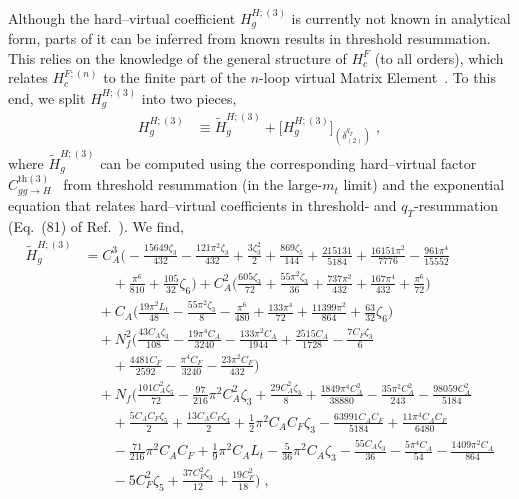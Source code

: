\documentclass[12pt]{article}
\DeclareRobustCommand{\nn}{\nonumber}
\DeclareRobustCommand{\qt}{\ensuremath{q_T}\xspace}
\begin{document}
Although the hard--virtual coefficient $H^{H;(3)}_{g}$ is currently not known in analytical form, parts of it can be inferred from known results in threshold resummation.
This relies on the knowledge of the general structure of $H^{F}_{c}$ (to all orders), which relates $H^{F;(n)}_{c}$ to the finite part of the $n$-loop virtual Matrix Element~\cite{Catani:2013tia}.
To this end, we split $H^{H;(3)}_{g}$ into two pieces,
\begin{align}
  H^{H;(3)}_g  
  &\equiv  
  \widetilde{H}^{H;(3)}_{g} + \big[H^{H;(3)}_{g}\big]_{(\delta^{\qt}_{(2)})} \;,
  \label{H3deltaqT2}
\end{align}
where $\widetilde{H}^{H;(3)}_{g}$ can be computed using the corresponding hard--virtual factor $C^{\mathrm{th}(3)}_{gg\to H}$~\cite{Catani:2014uta} from threshold resummation (in the large-$m_t$ limit) and the exponential equation that relates hard--virtual coefficients in threshold- and $\qt$-resummation (Eq.~(81) of Ref.~\cite{Catani:2013tia}). We find,
\begin{align}
  \widetilde{H}^{H;(3)}_{g}
  &=
  C_{A}^{3} \biggl(
    -\frac{15649 \zeta_{3}}{432}
    -\frac{121 \pi ^2 \zeta_{3}}{432}
    +\frac{3\zeta_{3}^2}{2}
    +\frac{869 \zeta_{ 5}}{144}
    +\frac{215131}{5184}
    +\frac{16151 \pi ^2}{7776}
    -\frac{961\pi ^4}{15552}
    \nn\\&\qquad
    +\frac{\pi ^6}{810}
    +\frac{105}{32} \zeta_{6}
  \biggr)
  + C_{A}^{2} \biggl(
    \frac{605 \zeta_{ 3}}{72}
    +\frac{55 \pi ^2 \zeta_{ 3}}{36}
    +\frac{737 \pi ^2}{432}
    +\frac{167 \pi ^4}{432}
    +\frac{\pi^6}{72}
  \biggr) 
  \nn\\&\quad
  + C_{A} \biggl( 
    \frac{19 \pi ^2  L_{t}}{48}
    -\frac{55 \pi ^2 \zeta _{3}}{8}
    -\frac{\pi ^6}{480}
    +\frac{133 \pi ^4}{72}
    +\frac{11399\pi ^2}{864}  
    +\frac{63}{32} \zeta_{6}
  \biggr)
  \nn\\&\quad
  + N_{f}^{2} \biggl( 
    \frac{43 C_{A} \zeta_{ 3}}{108}
    -\frac{19 \pi ^4 C_{A}}{3240}
    -\frac{133 \pi ^2 C_{A}}{1944}
    +\frac{2515C_{A}}{1728}
    -\frac{7 C_{F} \zeta_{ 3}}{6}
    \nn\\&\qquad
    +\frac{4481 C_{F}}{2592}
    -\frac{\pi ^4C_{F}}{3240}
    -\frac{23 \pi ^2 C_{F}}{432} 
  \biggr)
  \nn\\&\quad
  + N_{f} \biggl(
    \frac{101 C_{A}^2 \zeta_{5}}{72}
    -\frac{97}{216} \pi ^2 C_{A}^2 \zeta_{3}
    +\frac{29 C_{A}^2 \zeta_{3}}{8}
    +\frac{1849 \pi ^4 C_{A}^2}{38880}
    -\frac{35 \pi ^2 C_{A}^2}{243}
    -\frac{98059C_{A}^2}{5184}
    \nn\\&\qquad
    +\frac{5 C_{A} C_{F} \zeta _{5}}{2}
    +\frac{13 C_{A} C_{F} \zeta_{3}}{2}
    +\frac{1}{2} \pi ^2 C_{A} C_{F} \zeta _{3}
    -\frac{63991 C_{A} C_{F}}{5184}
    +\frac{11 \pi ^4C_{A} C_{F}}{6480}
    \nn\\&\qquad
    -\frac{71}{216} \pi ^2 C_{A} C_{F}
    +\frac{1}{9} \pi ^2 C_{A}L_{t}
    -\frac{5}{36} \pi ^2 C_{A} \zeta _{3}
    -\frac{55 C_{A} \zeta_{ 3}}{36}
    -\frac{5 \pi ^4C_{A}}{54}
    -\frac{1409 \pi ^2 C_{A}}{864}
    \nn\\&\qquad
    -5 C_{F}^2 \zeta_{ 5}
    +\frac{37 C_{F}^2 \zeta_{3}}{12}
    +\frac{19 C_{F}^2}{18}
  \biggr) \;,
  \label{H3approx}
\end{align}
\end{document}
